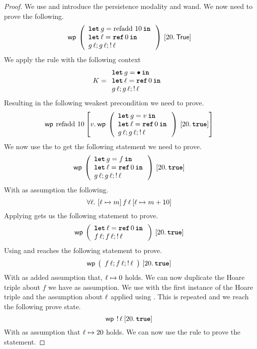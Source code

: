 \documentclass[thesis.tex]{subfiles}
\begin{document}
\begin{proof}
  We use  and introduce the persistence modality and wand. We now need to prove the following.
  \[\wpre{
      \left(
      \begin{array}{l}
        \Let g = \operatorname{refadd}\, 10 in \\
        \Let \loc = \Alloc 0 in                \\
        g\, \loc; g\, \loc; \deref \loc
      \end{array}
      \right)
    }{\Ret 20. \TRUE}\]
  We apply the  rule with the following context
  \[
    \lctx = \begin{array}{l}
      \Let g = \bullet in     \\
      \Let \loc = \Alloc 0 in \\
      g\, \loc; g\, \loc; \deref \loc
    \end{array}
  \]
  Resulting in the following weakest precondition we need to prove.
  \[
    \wpre{\operatorname{refadd}\, 10}{
      \Ret\val. \wpre{\left(\begin{array}{l}
          \Let g = \val in        \\
          \Let \loc = \Alloc 0 in \\
          g\, \loc; g\, \loc; \deref \loc
        \end{array}\right)}{\Ret 20. \True}
    }
  \]
  We now use the  to get the following statement we need to prove.
  \[
    \wpre{\left(\begin{array}{l}
        \Let g = f in           \\
        \Let \loc = \Alloc 0 in \\
        g\, \loc; g\, \loc; \deref \loc
      \end{array}\right)}{\Ret 20. \True}
  \]
  With as assumption the following.
  \[
    \forall \loc.\ \hoare{\loc \fmapsto m}{f\, \loc}{\loc\fmapsto m + 10}
  \]
  Applying  gets us the following statement to prove.
  \[
    \wpre{\left(\begin{array}{l}
        \Let \loc = \Alloc 0 in \\
        f\, \loc; f\, \loc; \deref \loc
      \end{array}\right)}{\Ret 20. \True}
  \]
  Using  and  reaches the following statement to prove.
  \[
    \wpre{\left(\begin{array}{l}
        f\, \loc; f\, \loc; \deref \loc
      \end{array}\right)}{\Ret 20. \True}
  \]
  With as added assumption that, $\loc \fmapsto 0$ holds. We can now duplicate the Hoare triple about $f$ we have as assumption. We use  with the first instance of the Hoare triple and the assumption about $\ell$ applied using . This is repeated and we reach the following prove state.
  \[
    \wpre{\deref \loc}{\Ret 20. \True}
  \]
  With as assumption that $\loc \fmapsto 20$ holds. We can now use the  rule to prove the statement.

\end{proof}
\end{document}
